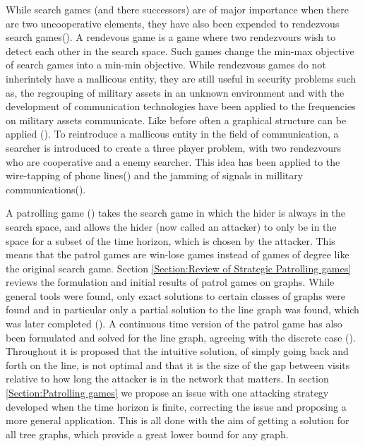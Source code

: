 \documentclass[a4paper,10pt]{article}
\theoremstyle{definition}
\theoremstyle{definition}
\theoremstyle{remark}
\theoremstyle{definition}
\begin{document}
While search games (and there successors) are of major importance when there are two uncooperative elements, they have also been expended to rendezvous search games(\cite{Steve2003}). A rendevous game is a game where two rendezvours wish to detect each other in the search space. Such games change the min-max objective of search games into a min-min objective. While rendezvous games do not inherintely have a mallicous entity, they are still useful in security problems such as, the regrouping of military assets in an unknown environment and with the development of communication technologies have been applied to the frequencies on military assets communicate. Like before often a graphical structure can be applied (\cite{Alpern1999}). To reintroduce a mallicous entity in the field of communication, a searcher is introduced to create a three player problem, with two rendezvours who are cooperative and a enemy searcher. This idea has been applied to the wire-tapping of phone lines(\cite{Alpern1998}) and the jamming of signals in millitary communications(\cite{Abdel-Rahman2014}).

A patrolling game (\citep{Alpern2011}) takes the search game in which the hider is always in the search space, and allows the hider (now called an attacker) to only be in the space for a subset of the time horizon, which is chosen by the attacker. This means that the patrol games are win-lose games instead of games of degree like the original search game. Section \ref{Section:Review of Strategic Patrolling games} reviews the formulation and initial results of patrol games on graphs. While general tools were found, only exact solutions to certain classes of graphs were found and in particular only a partial solution to the line graph was found, which was later completed (\cite{Papadaki2016}). A continuous time version of the patrol game has also been formulated and solved for the line graph, agreeing with the discrete case (\cite{Alpern2016}). Throughout it is proposed that the intuitive solution, of simply going back and forth on the line, is not optimal and that it is the size of the gap between visits relative to how long the attacker is in the network that matters. In section \ref{Section:Patrolling games} we propose an issue with one attacking strategy developed when the time horizon is finite, correcting the issue and proposing a more general application. This is all done with the aim of getting a solution for all tree graphs, which provide a great lower bound for any graph.
\end{document}
